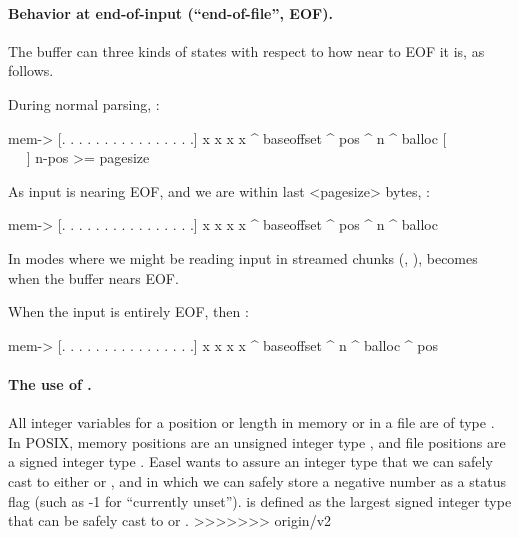 \paragraph{Behavior at end-of-input (``end-of-file'', EOF).}

The buffer can three kinds of states with respect to how near to EOF
it is, as follows.

During normal parsing, :

\begin{cchunk}
  mem->  {[. . . . . . . . . . . . . . . .] x x x x}
           ^ baseoffset    ^ pos            ^ n   ^ balloc
                          [~ ~ ~ ~ ~ ~ ~ ~]
                          n-pos >= pagesize
\end{cchunk}

As input is nearing EOF, and we are within last <pagesize> bytes,
:

\begin{cchunk}
 mem->  {[. . . . . . . . . . . . . . . .] x x x x}
          ^ baseoffset              ^ pos  ^ n   ^ balloc
\end{cchunk}

In modes where we might be reading input in streamed chunks
(, 
),  becomes 
when the buffer nears EOF.

When the input is entirely EOF, then :

\begin{cchunk}
  mem->  {[. . . . . . . . . . . . . . . .] x x x x}
           ^ baseoffset                     ^ n   ^ balloc
                                            ^ pos
\end{cchunk}





\paragraph{ The use of . }

All integer variables for a position or length in memory or in a file
are of type . In POSIX, memory positions are an
unsigned integer type , and file positions are a signed
integer type . Easel wants to assure an integer type
that we can safely cast to either  or ,
and in which we can safely store a negative number as a status flag
(such as -1 for ``currently unset'').  is defined
as the largest signed integer type that can be safely cast to
 or .
>>>>>>> origin/v2
